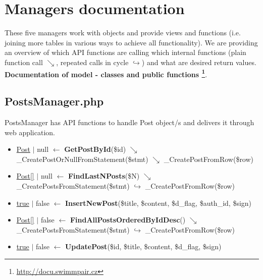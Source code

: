 \section{Managers documentation}
\par These five managers work with objects and provide views and functions (i.e. joining more tables in various ways to achieve all functionality). We are providing an overview of which API functions are calling which internal functions (plain function call $\searrow$, repeated calls in cycle $\hookrightarrow$) and what are desired return values.  
\newline
\textbf{Documentation of model - classes and public functions \footnote{\url{http://docu.swimmpair.cz}}}.

\subsection{PostsManager.php}
PostsManager has API functions to handle Post object/s and delivers it through web application.
\begin{itemize}
  \setlength\itemsep{0em}
  \item \underline{Post} $\vert$ null $\leftarrow$ \textbf{GetPostById}(\$id)
  \newline    $\searrow$ \_CreatePostOrNullFromStatement(\$stmt)
  \newline    $\searrow$ \_CreatePostFromRow(\$row)
  \item \underline{Post[]} $\vert$ null $\leftarrow$ \textbf{FindLastNPosts}(\$N)
  \newline    $\searrow$ \_CreatePostsFromStatement(\$stmt)
  \newline    $\hookrightarrow$ \_CreatePostFromRow(\$row)
  \item \underline{true} $\vert$ false $\leftarrow$ \textbf{InsertNewPost}(\$title, \$content, \$d\_flag, \$auth\_id, \$sign)
  \item \underline{Post[]} $\vert$ false $\leftarrow$ \textbf{FindAllPostsOrderedByIdDesc}()
  \newline    $\searrow$ \_CreatePostsFromStatement(\$stmt)
  \newline    $\hookrightarrow$ \_CreatePostFromRow(\$row)
  \item \underline{true} $\vert$ false $\leftarrow$ \textbf{UpdatePost}(\$id, \$title, \$content, \$d\_flag, \$sign)
\end{itemize}

